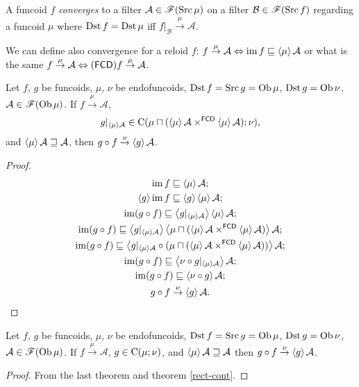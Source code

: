 \begin{defn}
A funcoid $f$ \emph{converges}
to a filter $\mathcal{A}\in\mathscr{F}(\operatorname{Src}\mu)$ on a filter $\mathcal{B}\in\mathscr{F}(\operatorname{Src} f)$
regarding a funcoid $\mu$ where $\operatorname{Dst} f=\operatorname{Dst}\mu$ iff $f|_{\mathcal{B}}\overset{\mu}{\rightarrow}\mathcal{A}$.\end{defn}
\begin{rem}
We can define also convergence for a reloid $f$: $f\overset{\mu}{\rightarrow}\mathcal{A}\Leftrightarrow\operatorname{im} f\sqsubseteq\left\langle \mu\right\rangle\mathcal{A}$
or what is the same $f\overset{\mu}{\rightarrow}\mathcal{A}\Leftrightarrow(\mathsf{FCD}) f\overset{\mu}{\rightarrow}\mathcal{A}$.\end{rem}
\begin{thm}
Let $f$, $g$ be funcoids, $\mu$, $\nu$ be endofuncoids, $\operatorname{Dst} f=\operatorname{Src} g=\operatorname{Ob}\mu$,
$\operatorname{Dst} g=\operatorname{Ob}\nu$, $\mathcal{A}\in\mathscr{F}(\operatorname{Ob}\mu)$. If $f\overset{\mu}{\rightarrow}\mathcal{A}$,
\[
g|_{\left\langle \mu\right\rangle\mathcal{A}}\in\mathrm{C}(\mu\sqcap(\left\langle \mu\right\rangle\mathcal{A}\times^{\mathsf{FCD}}\left\langle \mu\right\rangle\mathcal{A});\nu),
\]
and $\left\langle \mu\right\rangle\mathcal{A}\sqsupseteq\mathcal{A}$, then $g\circ f\overset{\nu}{\rightarrow}\left\langle g\right\rangle\mathcal{A}$.\end{thm}
\begin{proof}
~
\begin{gather*}
\operatorname{im} f\sqsubseteq\left\langle \mu\right\rangle\mathcal{A};\\
\left\langle g\right\rangle\operatorname{im} f\sqsubseteq\left\langle g\right\rangle\left\langle \mu\right\rangle\mathcal{A};\\
\operatorname{im}(g\circ f)\sqsubseteq\left\langle g|_{\left\langle \mu\right\rangle\mathcal{A}}\right\rangle\left\langle \mu\right\rangle\mathcal{A};\\
\operatorname{im}(g\circ f)\sqsubseteq\left\langle g|_{\left\langle \mu\right\rangle\mathcal{A}}\right\rangle\left\langle \mu\sqcap(\left\langle \mu\right\rangle\mathcal{A}\times^{\mathsf{FCD}}\left\langle \mu\right\rangle\mathcal{A})\right\rangle\mathcal{A};\\
\operatorname{im}(g\circ f)\sqsubseteq\left\langle g|_{\left\langle \mu\right\rangle\mathcal{A}}\circ(\mu\sqcap(\left\langle \mu\right\rangle\mathcal{A}\times^{\mathsf{FCD}}\left\langle \mu\right\rangle\mathcal{A}))\right\rangle\mathcal{A};\\
\operatorname{im}(g\circ f)\sqsubseteq\left\langle \nu\circ g|_{\left\langle \mu\right\rangle\mathcal{A}}\right\rangle\mathcal{A};\\
\operatorname{im}(g\circ f)\sqsubseteq\left\langle \nu\circ g\right\rangle\mathcal{A};\\
g\circ f\overset{\nu}{\rightarrow}\left\langle g\right\rangle\mathcal{A}.
\end{gather*}
\end{proof}
\begin{cor}
Let $f$, $g$ be funcoids, $\mu$, $\nu$ be endofuncoids, $\operatorname{Dst} f=\operatorname{Src} g=\operatorname{Ob}\mu$,
$\operatorname{Dst} g=\operatorname{Ob}\nu$, $\mathcal{A}\in\mathscr{F}(\operatorname{Ob}\mu)$. If $f\overset{\mu}{\rightarrow}\mathcal{A}$,
$g\in\mathrm{C}(\mu;\nu)$, and $\left\langle \mu\right\rangle\mathcal{A}\sqsupseteq\mathcal{A}$
then $g\circ f\overset{\nu}{\rightarrow}\left\langle g\right\rangle\mathcal{A}$.\end{cor}
\begin{proof}
From the last theorem and theorem \ref{rect-cont}.
\end{proof}

